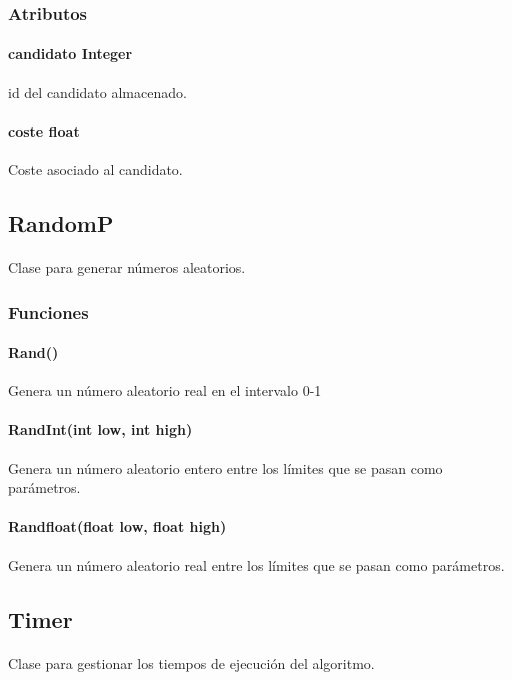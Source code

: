 \documentclass{article}
\begin{document}
	\subsubsection{Atributos}
	
	\paragraph{candidato Integer} id del candidato almacenado.
	
	\paragraph{coste float} Coste asociado al candidato.
	
	\subsection{RandomP}
	
	\paragraph{}Clase para generar números aleatorios.
	
	\subsubsection{Funciones}
	
	\paragraph{Rand()}Genera un número aleatorio real en el intervalo 0-1
	
	\paragraph{RandInt(int low, int high)}Genera un número aleatorio entero entre los límites que se pasan como parámetros.
	
	\paragraph{Randfloat(float low, float high)}Genera un número aleatorio real entre los límites que se pasan como parámetros.
	
	\subsection{Timer}
	
	\paragraph{}Clase para gestionar los tiempos de ejecución del algoritmo.
	
\end{document}
